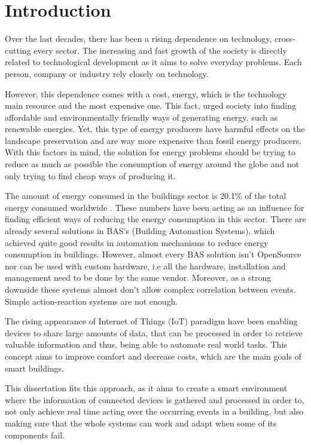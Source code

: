 

\chapter{Introduction}
\label{chapter:introduction}

Over the last decades, there has been a rising dependence on technology, cross-cutting every sector. The increasing and fast growth of the society is directly related to technological development as it aims to solve everyday problems. Each person, company or industry rely closely on technology.


However, this dependence comes with a cost, energy, which is the technology main resource and the most expensive one. This fact, urged society into finding affordable and environmentally friendly ways of generating energy, such as renewable energies. Yet, this type of energy producers have harmful effects on the landscape preservation and are way more expensive than fossil energy producers. With this factors in mind, the solution for energy problems should be trying to reduce as much as possible the consumption of energy around the globe and not only trying to find cheap ways of producing it.

The amount of energy consumed in the buildings sector is 20.1\% of the total energy consumed worldwide \cite{BuildingEnergy}. These numbers have been acting as an influence for finding efficient ways of reducing the energy consumption in this sector. There are already several solutions in BAS's (Building Automation Systems), which achieved quite good results in automation mechanisms to reduce energy consumption in buildings. However, almost every BAS solution isn't OpenSource nor can be used with custom hardware, i.e all the hardware, installation and management need to be done by the same vendor. Moreover, as a strong downside these systems almost don't allow complex correlation between events. Simple action-reaction systems are not enough.

The rising appearance of Internet of Things (IoT) paradigm have been enabling devices to share large amounts of data, that can be processed in order to retrieve valuable information and thus, being able to automate real world tasks. This concept aims to improve comfort and decrease costs, which are the main goals of smart buildings.

This dissertation fits this approach, as it aims to create a smart environment where the information of connected devices is gathered and processed in order to, not only achieve real time acting over the occurring events in a building, but also making sure that the whole systems can work and adapt when some of its components fail.

